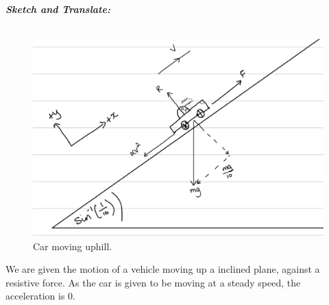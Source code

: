 %
%
%


\begin{subquestions}
	
\subquestion

\textbf{\textit{Sketch and Translate:}} \\ \\
\begin{figure}[H]
	\begin{center}
		\includegraphics[scale=0.25]{../2009/figures/2009q5-1}
		\caption{\label{2009:q5:Sketch1} Car moving uphill.}
	\end{center}
\end{figure}
We are given the motion of a vehicle moving up a inclined plane, against a resistive force. As the car is given to be moving at a steady speed, the acceleration is 0.
	

	
	

\end{subquestions}
